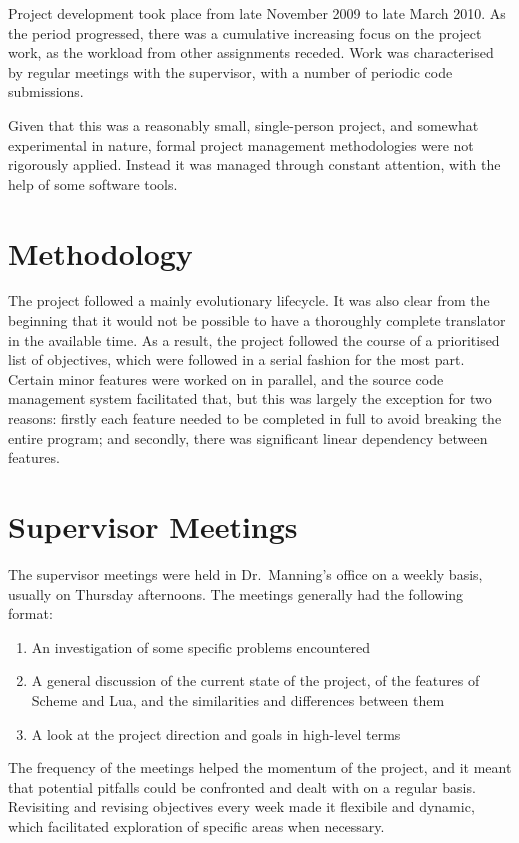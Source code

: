 Project development took place from late November 2009 to late March 2010. As
the period progressed, there was a cumulative increasing focus on the project
work, as the workload from other assignments receded. Work was characterised by
regular meetings with the supervisor, with a number of periodic code
submissions.

Given that this was a reasonably small, single-person project, and somewhat
experimental in nature, formal project management methodologies were not
rigorously applied. Instead it was managed through constant attention, with the
help of some software tools.


\section{Methodology}

The project followed a mainly evolutionary lifecycle. It was also clear from the
beginning that it would not be possible to have a thoroughly complete translator
in the available time.  As a result, the project followed the course of a
prioritised list of objectives, which were followed in a serial fashion for the
most part.  Certain minor features were worked on in parallel, and the source
code management system facilitated that, but this was largely the exception for
two reasons: firstly each feature needed to be completed in full to avoid
breaking the entire program; and secondly, there was significant linear
dependency between features.


\section{Supervisor Meetings}

The supervisor meetings were held in Dr.\ Manning's office on a weekly basis,
usually on Thursday afternoons. The meetings generally had the following format:

\begin{enumerate}
\item An investigation of some specific problems encountered
\item A general discussion of the current state of the project, of the
features of Scheme and Lua, and the similarities and differences between
them
\item A look at the project direction and goals in high-level terms
\end{enumerate}

The frequency of the meetings helped the momentum of the project, and it meant
that potential pitfalls could be confronted and dealt with on a regular basis.
Revisiting and revising objectives every week made it flexibile and dynamic,
which facilitated exploration of specific areas when necessary.


